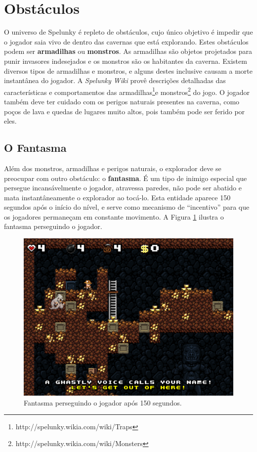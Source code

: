 \section{\label{section:spelunky-obstacles}Obstáculos}
O universo de Spelunky é repleto de obstáculos, cujo único objetivo é impedir
que o jogador saia vivo de dentro das cavernas que está explorando. Estes
obstáculos podem ser \textbf{armadilhas} ou \textbf{monstros}. As armadilhas são
objetos projetados para punir invasores indesejados e os monstros são os
habitantes da caverna. Existem diversos tipos de armadilhas e monstros, e alguns
destes inclusive causam a morte instantânea do jogador. A \textit{Spelunky Wiki}
provê descrições detalhadas das características e comportamentos das
armadilhas\footnote{http://spelunky.wikia.com/wiki/Traps}e
monstros\footnote{http://spelunky.wikia.com/wiki/Monsters} do jogo. O jogador
também deve ter cuidado com os perigos naturais presentes na caverna, como poços
de lava e quedas de lugares muito altos, pois também pode ser ferido por eles.

\subsection{\label{sub:ghost}O Fantasma}
Além dos monstros, armadilhas e perigos naturais, o explorador deve se preocupar
com outro obstáculo: o \textbf{fantasma}. É um tipo de inimigo especial que
persegue incansávelmente o jogador, atravessa paredes, não pode ser abatido e
mata instantâneamente o explorador ao tocá-lo. Esta entidade aparece 150
segundos após o início do nível, e serve como mecanismo de ``incentivo'' para que
os jogadores permaneçam em constante movimento. A Figura
\ref{fig:spelunky-ghost} ilustra o fantasma perseguindo o jogador.

\begin{figure}[htb!]
\centering
\includegraphics[width=.65\textwidth]{fig/spelunky-ghost.pdf}
\caption{Fantasma perseguindo o jogador após 150 segundos.}
\label{fig:spelunky-ghost}
\end{figure}


